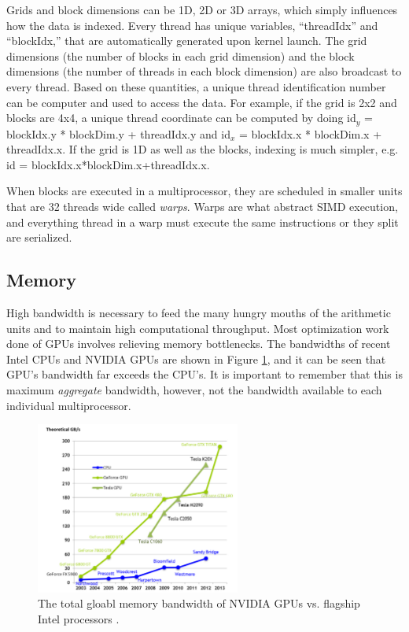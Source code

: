 Grids and block dimensions can be 1D, 2D or 3D arrays, which simply influences how the data is indexed.  Every thread has unique variables, ``threadIdx'' and ``blockIdx,'' that are automatically generated upon kernel launch.  The grid dimensions (the number of blocks in each grid dimension) and the block dimensions (the number of threads in each block dimension) are also broadcast to every thread.  Based on these quantities, a unique thread identification number can be computer and used to access the data.   For example, if the grid is 2x2 and blocks are 4x4, a unique thread coordinate can be computed by doing id$_y$ = blockIdx.y * blockDim.y + threadIdx.y and id$_x$ = blockIdx.x * blockDim.x + threadIdx.x.  If the grid is 1D as well as the blocks, indexing is much simpler, e.g. id = blockIdx.x*blockDim.x+threadIdx.x.

When blocks are executed in a multiprocessor, they are scheduled in smaller units that are 32 threads wide called \emph{warps}.  Warps are what abstract SIMD execution, and everything thread in a warp must execute the same instructions or they split are serialized.

\subsection{Memory}

High bandwidth is necessary to feed the many hungry mouths of the arithmetic units and to maintain high computational throughput.  Most optimization work done of GPUs involves relieving memory bottlenecks.  The bandwidths of recent Intel CPUs and NVIDIA GPUs are shown in Figure \ref{bandwidth}, and it can be seen that GPU's bandwidth far exceeds the CPU's.  It is important to remember that this is maximum \emph{aggregate} bandwidth, however, not the bandwidth available to each individual multiprocessor.   

\begin{figure}[h!] 
  \centering
    \includegraphics[width=0.6\textwidth]{graphics/memory_bandwidth.pdf}
     \caption{The total gloabl memory bandwidth of NVIDIA GPUs vs. flagship Intel processors \cite{cuda}. \label{bandwidth}}
\end{figure}

